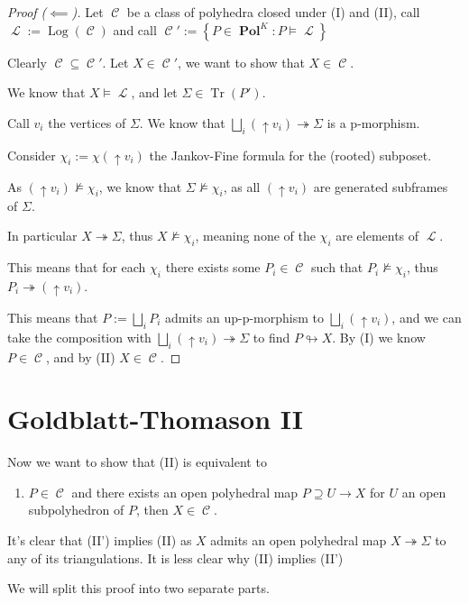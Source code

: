 \documentclass[12pt]{article}
\DeclareMathOperator{\Log}{Log}
\DeclareMathOperator{\Tr}{Tr}
\DeclareMathOperator{\C}{\mathcal{C}}
\DeclareMathOperator{\Ll}{\mathcal{L}}
\DeclareMathOperator{\Pol}{\textbf{Pol}}
\DeclareMathOperator{\upred}{\looparrowright}
\newcommand{\set}[1]{\left\{#1\right\}}
\numberwithin{equation}{subsection}
\begin{document}
\begin{proof}[Proof ($\impliedby$)]

Let $\C$ be a class of polyhedra closed under (I) and (II), call $\Ll:=\Log(\C)$ and call $\C':=\set{P\in \Pol^K:P\models \Ll}$

Clearly $\C\subseteq \C'$.
Let $X\in \C'$, we want to show that $X\in \C$.

We know that $X\models \Ll$, and let $\Sigma\in \Tr(P')$. 

Call $v_i$ the vertices of $\Sigma$. We know that $\bigsqcup_i (\uparrow v_i)\twoheadrightarrow \Sigma$ is a p-morphism.

Consider $\chi_i:=\chi(\uparrow v_i)$ the Jankov-Fine formula for the (rooted) subposet. 

As $(\uparrow v_i)\not\models \chi_i$, we know that $\Sigma\not\models\chi_i$, as all $(\uparrow v_i)$ are generated subframes of $\Sigma$.

In particular $X\twoheadrightarrow\Sigma$, thus $X\not\models\chi_i$, meaning none of the $\chi_i$ are elements of $\Ll$. 

This means that for each $\chi_i$ there exists some $P_i\in \C$ such that $P_i\not\models \chi_i$, thus $P_i\twoheadrightarrow (\uparrow v_i)$.

This means that $P:=\bigsqcup_i P_i$ admits an up-p-morphism to $\bigsqcup_i(\uparrow v_i)$, and we can take the composition with $\bigsqcup_i(\uparrow v_i)\twoheadrightarrow \Sigma$ to find $P\upred X$.
	By (I) we know $P\in \C$, and by (II) $X\in \C$.
\end{proof}
\section{Goldblatt-Thomason II}
Now we want to show that (II) is equivalent to 
\begin{enumerate}[(I')]
\addtocounter{enumi}{1}
	\item $P\in \C$ and there exists an open polyhedral map $P\supseteq U\to X$ for $U$ an open subpolyhedron of $P$, then $X\in \C$.
\end{enumerate}

It's clear that (II') implies (II) as $X$ admits an open polyhedral map $X\twoheadrightarrow \Sigma$ to any of its triangulations. 
It is less clear why (II) implies (II')

We will split this proof into two separate parts.
\end{document}
